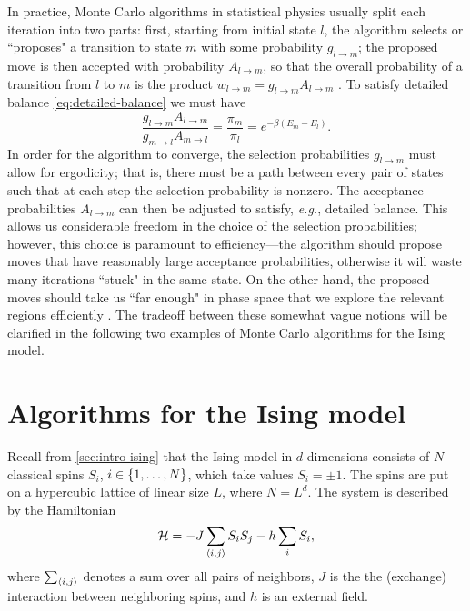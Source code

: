In practice, Monte Carlo algorithms in statistical physics usually split each
iteration into two parts: first, starting from initial state $l$, the algorithm
selects or ``proposes" a transition to state $m$ with some probability
$g_{l \to m}$; the proposed move is then accepted with probability
$A_{l \to m}$, so that the overall probability of a transition from $l$ to $m$
is the product $w_{l \to m} = g_{l \to m} A_{l \to m}$
\autocite{newman1999monte}. To satisfy detailed balance
\eqref{eq:detailed-balance} we must have
\begin{equation}
  \frac{g_{l \to m} A_{l \to m}}{g_{m \to l} A_{m \to l}}
  = \frac{\pi_m}{\pi_l}
  = e^{-\beta(E_m - E_l)}.
  \label{eq:select-accept}
\end{equation}
In order for the algorithm to converge, the selection probabilities $g_{l \to
  m}$ must allow for ergodicity; that is, there must be a path between every
pair of states such that at each step the selection probability is nonzero. The
acceptance probabilities $A_{l \to m}$ can then be adjusted to satisfy,
\emph{e.g.}, detailed balance. This allows us considerable freedom in the
choice of the selection probabilities; however, this choice is paramount to
efficiency---the algorithm should propose moves that have reasonably large
acceptance probabilities, otherwise it will waste many iterations ``stuck" in
the same state. On the other hand, the proposed moves should take us ``far
enough" in phase space that we explore the relevant regions efficiently . The
tradeoff between these somewhat vague notions will be clarified in the
following two examples of Monte Carlo algorithms for the Ising model.


\section{Algorithms for the Ising model}

Recall from \cref{sec:intro-ising} that the Ising model in $d$ dimensions
consists of $N$ classical spins $S_i$, $i \in \cbr{1,\dots,N}$, which take
values $S_i = \pm 1$. The spins are put on a hypercubic lattice of linear size
$L$, where $N=L^d$. The system is described by the Hamiltonian
\begin{equation}
  \mathcal{H} = -J \sum_{\langle i,j \rangle} S_i S_j - h \sum_i S_i,
\end{equation}
where $\sum_{\langle i,j \rangle}$ denotes a sum over all pairs of neighbors, $J$ is the the
(exchange) interaction between neighboring spins, and $h$ is an external field.


